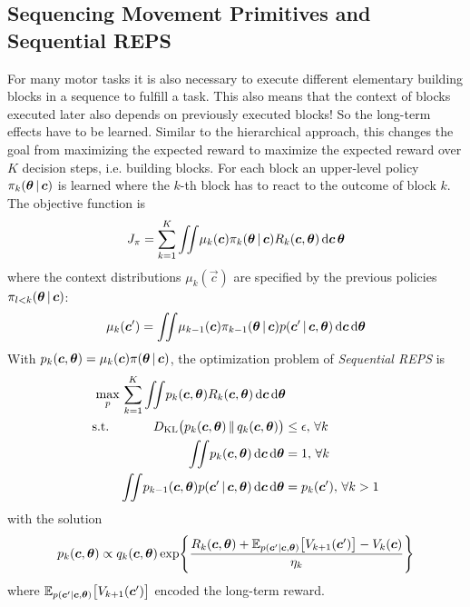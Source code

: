 		\subsection{Sequencing Movement Primitives and Sequential REPS}
			For many motor tasks it is also necessary to execute different elementary building blocks in a sequence to fulfill a task. This also means that the context of blocks executed later also depends on previously executed blocks! So the long-term effects have to be learned. Similar to the hierarchical approach, this changes the goal from maximizing the expected reward to maximize the expected reward over \(K\) decision steps, i.e. building blocks. For each block an upper-level policy \( \pi_k(\bm{\theta} \,\vert\, \bm{c}) \) is learned where the \(k\)-th block has to react to the outcome of block \(k\). The objective function is
			\begin{equation*}
				J_\pi = \sum_{k = 1}^{K} \iint\! \mu_k(\bm{c}) \pi_k(\bm{\theta} \,\vert\, \bm{c}) R_k(\bm{c}, \bm{\theta}) \dd{\bm{c}} \bm{\theta}
			\end{equation*}
			where the context distributions \( \mu_k(\vec{c}) \) are specified by the previous policies \( \pi_{l < k}(\bm{\theta} \,\vert\, \bm{c}) \):
			\begin{equation*}
				\mu_k(\bm{c}') = \iint\! \mu_{k - 1}(\bm{c}) \pi_{k - 1}(\bm{\theta} \,\vert\, \bm{c}) p(\bm{c}' \,\vert\, \bm{c}, \bm{\theta}) \dd{\bm{c}} \dd{\bm{\theta}}
			\end{equation*}
			With \( p_k(\bm{c}, \bm{\theta}) = \mu_k(\bm{c}) \pi(\bm{\theta} \,\vert\, \bm{c}) \), the optimization problem of \emph{Sequential REPS} is
			\begin{equation*}
				\begin{aligned}
					\max_p \,& \sum_{k = 1}^{K} \iint\! p_k(\bm{c}, \bm{\theta}) R_k(\bm{c}, \bm{\theta}) \dd{\bm{c}} \dd{\bm{\theta}} \\
					\mathrm{s.t.} \quad&
						\begin{aligned}[t]
							D_\mathrm{KL}\big( p_k(\bm{c}, \bm{\theta}) \,\Vert\, q_k(\bm{c}, \bm{\theta}) \big) &\leq \epsilon,\, \forall k \\
							\iint\! p_k(\bm{c}, \bm{\theta}) \dd{\bm{c}} \dd{\bm{\theta}} &= 1,\, \forall k \\
							\iint\! p_{k - 1}(\bm{c}, \bm{\theta}) p(\bm{c}' \,\vert\, \bm{c}, \bm{\theta}) \dd{\bm{c}} \dd{\bm{\theta}} &= p_k(\bm{c}'),\, \forall k > 1
						\end{aligned}
				\end{aligned}
			\end{equation*}
			with the solution
			\begin{equation*}
				p_k(\bm{c}, \bm{\theta}) \propto q_k(\bm{c}, \bm{\theta}) \exp{ \frac{R_k(\bm{c}, \bm{\theta}) + \mathbb{E}_{p(\bm{c}' \vert\bm{c}, \bm{\theta})}\big[ V_{k + 1}(\bm{c}') \big] - V_k(\bm{c})}{\eta_k} }
			\end{equation*}
			where \( \mathbb{E}_{p(\bm{c}' \vert \bm{c}, \bm{\theta})}\big[ V_{k + 1}(\bm{c}') \big] \) encoded the long-term reward.

